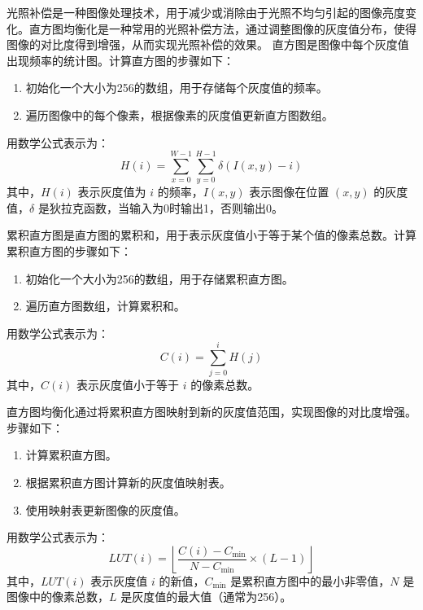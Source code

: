 \documentclass[12pt,hyperref,a4paper,UTF8]{ctexart}
\begin{document}
        光照补偿是一种图像处理技术，用于减少或消除由于光照不均匀引起的图像亮度变化。直方图均衡化是一种常用的光照补偿方法，通过调整图像的灰度值分布，使得图像的对比度得到增强，从而实现光照补偿的效果。
        直方图是图像中每个灰度值出现频率的统计图。计算直方图的步骤如下：
        \begin{enumerate}
            \item 初始化一个大小为256的数组，用于存储每个灰度值的频率。
            \item 遍历图像中的每个像素，根据像素的灰度值更新直方图数组。
        \end{enumerate}

        用数学公式表示为：
        \[
        H(i) = \sum_{x=0}^{W-1} \sum_{y=0}^{H-1} \delta(I(x, y) - i)
        \]
        其中，$H(i)$ 表示灰度值为 $i$ 的频率，$I(x, y)$ 表示图像在位置 $(x, y)$ 的灰度值，$\delta$ 是狄拉克函数，当输入为0时输出1，否则输出0。

        累积直方图是直方图的累积和，用于表示灰度值小于等于某个值的像素总数。计算累积直方图的步骤如下：
        \begin{enumerate}
            \item 初始化一个大小为256的数组，用于存储累积直方图。
            \item 遍历直方图数组，计算累积和。
        \end{enumerate}

        用数学公式表示为：
        \[
        C(i) = \sum_{j=0}^{i} H(j)
        \]
        其中，$C(i)$ 表示灰度值小于等于 $i$ 的像素总数。

        直方图均衡化通过将累积直方图映射到新的灰度值范围，实现图像的对比度增强。步骤如下：
        \begin{enumerate}
            \item 计算累积直方图。
            \item 根据累积直方图计算新的灰度值映射表。
            \item 使用映射表更新图像的灰度值。
        \end{enumerate}

        用数学公式表示为：
        \[
        LUT(i) = \left\lfloor \frac{C(i) - C_{\min}}{N - C_{\min}} \times (L - 1) \right\rfloor
        \]
        其中，$LUT(i)$ 表示灰度值 $i$ 的新值，$C_{\min}$ 是累积直方图中的最小非零值，$N$ 是图像中的像素总数，$L$ 是灰度值的最大值（通常为256）。
\end{document}
